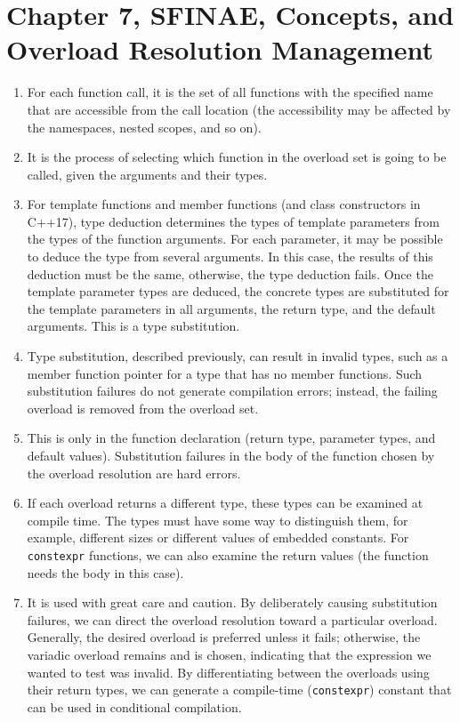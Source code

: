 \section{Chapter 7, SFINAE, Concepts, and Overload Resolution Management}

\begin{enumerate}
\item
  For each function call, it is the set of all functions with the specified name that are accessible from the call location (the accessibility may be affected by the namespaces, nested scopes, and so on).
\item
  It is the process of selecting which function in the overload set is going to be called, given the arguments and their types.
\item
  For template functions and member functions (and class constructors in C++17), type deduction determines the types of template parameters from the types of the function arguments. For each parameter, it may be possible to deduce the type from several arguments. In this case, the results of this deduction must be the same, otherwise, the type deduction fails. Once the template parameter types are deduced, the concrete types are substituted for the template parameters in all arguments, the return type, and the default arguments. This is a type substitution.
\item
  Type substitution, described previously, can result in invalid types, such as a member function pointer for a type that has no member functions. Such substitution failures do not generate compilation errors; instead, the failing overload is removed from the overload set.
\item
  This is only in the function declaration (return type, parameter types, and default values). Substitution failures in the body of the function chosen by the overload resolution are hard errors.
\item
  If each overload returns a different type, these types can be examined at compile time. The types must have some way to distinguish them, for example, different sizes or different values of embedded constants. For \texttt{constexpr} functions, we can also examine the return values (the function needs the body in this case).
\item
  It is used with great care and caution. By deliberately causing substitution failures, we can direct the overload resolution toward a particular overload. Generally, the desired overload is preferred unless it fails; otherwise, the variadic overload remains and is chosen, indicating that the expression we wanted to test was invalid. By differentiating between the overloads using their return types, we can generate a compile-time (\texttt{constexpr}) constant that can be used in conditional compilation.

\end{enumerate}

